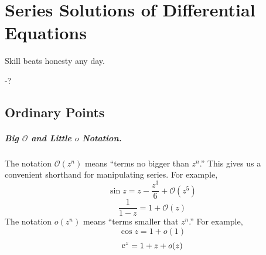 \flushbottom




\chapter{Series Solutions of Differential Equations}



Skill beats honesty any day.

\begin{flushright}
  -?
\end{flushright}



\section{Ordinary Points}

\paragraph{Big $\mathcal{O}$ and Little $o$ Notation.}
The notation $\mathcal{O}(z^n)$ means ``terms no bigger than $z^n$.''  This
gives us a convenient shorthand for manipulating series.  For example,
\[
\sin z = z - \frac{z^3}{6} + \mathcal{O}(z^5) 
\]
\[
\frac{1}{1-z} = 1 + \mathcal{O}(z)
\]
The notation $o(z^n)$ means ``terms smaller that $z^n$.''  For example,
\[
\cos z = 1 + o(1) 
\]
\[
\mathop{\mathrm{e}}\nolimits^z = 1 + z + o(z)
\]





